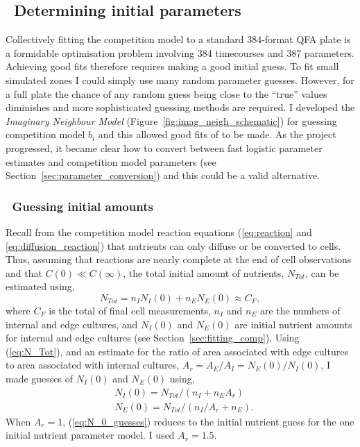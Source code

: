 \subsection{\thesubsection~Determining initial parameters}
\label{sec:initial_guess}

Collectively fitting the competition model to a standard 384-format
QFA plate is a formidable optimisation problem involving 384
timecourses and 387 parameters. Achieving good fits therefore requires
making a good initial guess. To fit small simulated zones I could
simply use many random parameter guesses. However, for a full plate
the chance of any random guess being close to the ``true'' values
diminishes and more sophisticated guessing methods are required. I
developed the \textit{Imaginary Neighbour Model}
(Figure~\ref{fig:imag_neigh_schematic}) for guessing competition model
\(b_{i}\) and this allowed good fits of to be made. As the project
progressed, it became clear how to convert between fast logistic
parameter estimates and competition model parameters (see
Section~\ref{sec:parameter_conversion}) and this could be a valid
alternative.

\subsubsection{\thesubsubsection~Guessing initial amounts}
\label{sec:guessing_amounts}

Recall from the competition model reaction equations
(\ref{eq:reaction} and \ref{eq:diffusion_reaction}) that nutrients can
only diffuse or be converted to cells. Thus, assuming that reactions
are nearly complete at the end of cell observations and that
\(C(0) \ll C(\infty)\), the total initial amount of nutrients,
\(N_{Tot}\), can be estimated using,
\begin{equation}
  \label{eq:N_Tot}
  N_{Tot} = n_{I}N_{I}(0) + n_{E}N_{E}(0) \approx C_{F},
\end{equation}
where \(C_{F}\) is the total of final cell measurements, \(n_{I}\) and
\(n_{E}\) are the numbers of internal and edge cultures, and
\(N_{I}(0)\) and \(N_{E}(0)\) are initial nutrient amounts
for internal and edge cultures (see
Section~\ref{sec:fitting_comp}). Using (\ref{eq:N_Tot}), and an estimate
for the ratio of area associated with edge cultures to area associated
with internal cultures,
\(A_{r} = A_{E} / A_{I} = N_{E}(0) / N_{I}(0)\), I made
guesses of \(N_{I}(0)\) and \(N_{E}(0)\) using,
%
\begin{equation}
  \label{eq:N_0_guesses}
  \begin{aligned}
    &N_{I}(0) = N_{Tot} / (n_{I} + n_{E}A_{r})\\
    &N_{E}(0) = N_{Tot} / (n_{I}/A_{r} + n_{E}).
  \end{aligned}
\end{equation}
%
When \(A_{r} = 1\), (\ref{eq:N_0_guesses}) reduces to the initial
nutrient guess for the one initial nutrient parameter model. I used
\(A_{r} = 1.5\).

